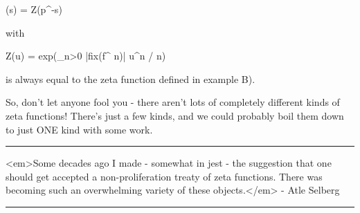 \zeta (s) = Z(p^{-s})

with 

Z(u) = exp(\sum_{n>0} |fix(f^{ n})| u^{n} / n)

is always equal to the zeta function defined in example B).

So, don't let anyone fool you - there aren't lots of completely
different kinds of zeta functions!  There's just a few kinds, and 
we could probably boil them down to just ONE kind with some work.







\par\noindent\rule{\textwidth}{0.4pt}
<em>Some decades ago I made - somewhat in jest - the suggestion that one should 
get accepted a non-proliferation treaty of zeta functions.  There was 
becoming such an overwhelming variety of these objects.</em> - Atle Selberg

\par\noindent\rule{\textwidth}{0.4pt}

